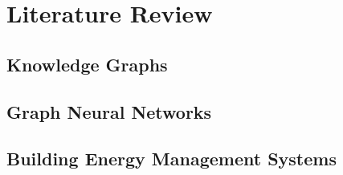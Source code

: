 \chapter{Literature Review}\label{chap:literature-review}

\section{Knowledge Graphs}\label{sec:knowledge-graphs}


\section{Graph Neural Networks}\label{sec:graph-neural-networks}


\section{Building Energy Management Systems}\label{sec:building-energy-management-systems}

